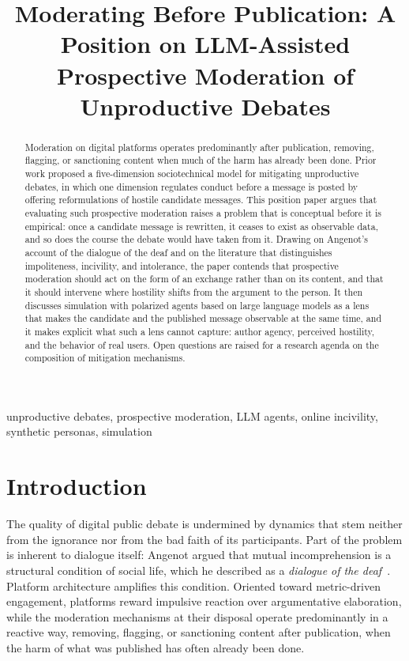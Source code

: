 \documentclass[conference]{IEEEtran}
\title{Moderating Before Publication: A Position on LLM-Assisted
Prospective Moderation of Unproductive Debates}
\author{\IEEEauthorblockN{Anonymous Author(s)}
\IEEEauthorblockA{\textit{Affiliation omitted for double-blind review}}}
\begin{document}
\maketitle

\begin{abstract}
Moderation on digital platforms operates predominantly after publication,
removing, flagging, or sanctioning content when much of the harm has already
been done. Prior work proposed a five-dimension sociotechnical model for
mitigating unproductive debates, in which one dimension regulates conduct
before a message is posted by offering reformulations of hostile candidate
messages. This position paper argues that evaluating such prospective
moderation raises a problem that is conceptual before it is empirical: once a
candidate message is rewritten, it ceases to exist as observable data, and so
does the course the debate would have taken from it. Drawing on Angenot's
account of the dialogue of the deaf and on the literature that distinguishes
impoliteness, incivility, and intolerance, the paper contends that prospective
moderation should act on the form of an exchange rather than on its content,
and that it should intervene where hostility shifts from the argument to the
person. It then discusses simulation with polarized agents based on large
language models as a lens that makes the candidate and the published message
observable at the same time, and it makes explicit what such a lens cannot
capture: author agency, perceived hostility, and the behavior of real users.
Open questions are raised for a research agenda on the composition of
mitigation mechanisms.
\end{abstract}

\begin{IEEEkeywords}
unproductive debates, prospective moderation, LLM agents, online incivility,
synthetic personas, simulation
\end{IEEEkeywords}

\section{Introduction}\label{sec:intro}

The quality of digital public debate is undermined by dynamics that stem
neither from the ignorance nor from the bad faith of its participants. Part of
the problem is inherent to dialogue itself: Angenot argued that mutual
incomprehension is a structural condition of social life, which he described
as a \textit{dialogue of the deaf}~\cite{angenot2008dialogues}. Platform
architecture amplifies this condition. Oriented toward metric-driven
engagement, platforms reward impulsive reaction over argumentative
elaboration, while the moderation mechanisms at their disposal operate
predominantly in a reactive way, removing, flagging, or sanctioning content
after publication, when the harm of what was published has often already been
done.
\end{document}
